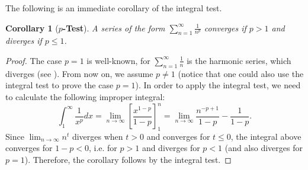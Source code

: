 \documentclass[12pt]{article}
\newtheorem*{cor}{Corollary}
\theoremstyle{definition}
\newcommand{\limn}{\lim_{n\to\infty}}
\newcommand{\sumn}{\sum_{n=1}^\infty }
\begin{document}
The following is an immediate corollary of the integral test.

\begin{cor}[{\bf $p$-Test}]
A series of the form $\sumn \frac{1}{n^p}$ converges if $p>1$ and diverges if $p\leq 1$.
\end{cor}
\begin{proof}
The case $p=1$ is well-known, for $\sumn \frac{1}{n}$ is the harmonic series, which diverges (see ). From now on, we assume $p\neq 1$ (notice that one could also use the integral test to prove the case $p=1$). In order to apply the integral test, we need to calculate the following improper integral:
$$\int_1^\infty \frac{1}{x^p} dx=\lim_{n\to \infty}\left[ \frac{x^{1-p}}{1-p} \right]_1^n= \limn \frac{n^{-p+1}}{1-p}-\frac{1}{1-p}.$$
Since $\limn n^t$ diverges when $t>0$ and converges for $t \leq 0$, the integral above converges for $1-p < 0$, i.e. for $p>1$ and diverges for $p<1$ (and also diverges for $p=1$). Therefore, the corollary follows by the integral test.
\end{proof}
\end{document}
